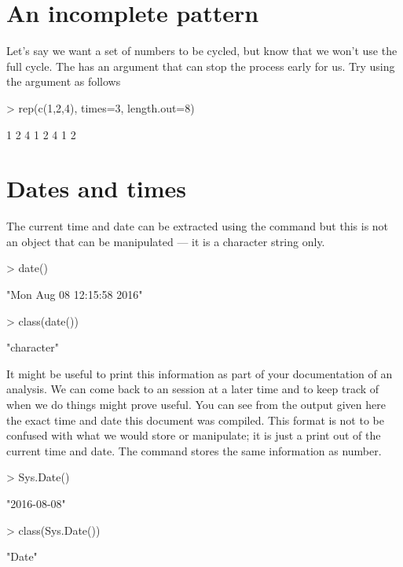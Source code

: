 \section{An incomplete pattern} 
 
Let's say we want a set of numbers to be cycled, but know that we won't use the full cycle. The  has an argument that can stop the process early for us. Try using the  argument as follows 
\begin{Schunk}
\begin{Sinput}
> rep(c(1,2,4), times=3, length.out=8) 
\end{Sinput}
\begin{Soutput}
[1] 1 2 4 1 2 4 1 2
\end{Soutput}
\end{Schunk}
 
 
\section{Dates and times} 
 
The current time and date can be extracted using the  command but this is not an object that can be manipulated --- it is a character string only. 
\begin{Schunk}
\begin{Sinput}
> date() 
\end{Sinput}
\begin{Soutput}
[1] "Mon Aug 08 12:15:58 2016"
\end{Soutput}
\begin{Sinput}
> class(date()) 
\end{Sinput}
\begin{Soutput}
[1] "character"
\end{Soutput}
\end{Schunk}
It might be useful to print this information as part of your documentation of an analysis. We can come back to an \R{} session at a later time and to keep track of when we do things might prove useful. You can see from the output given here the exact time and date this document was compiled. This format is not to be confused with what we would store or manipulate; it is just a print out of the current time and date. The  command stores the same information as number. 
\begin{Schunk}
\begin{Sinput}
> Sys.Date() 
\end{Sinput}
\begin{Soutput}
[1] "2016-08-08"
\end{Soutput}
\begin{Sinput}
> class(Sys.Date()) 
\end{Sinput}
\begin{Soutput}
[1] "Date"
\end{Soutput}
\end{Schunk}
 

